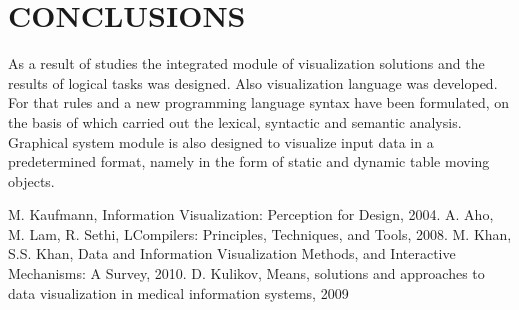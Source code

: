 \documentclass[a4paper, 10pt, conference]{ieeeconf}
\begin{document}
\section{CONCLUSIONS}

As a result of studies the integrated module of visualization solutions and the results of logical tasks was designed. Also visualization language was developed. For that rules and  a new programming language syntax  have been formulated, on the basis of which carried out the lexical, syntactic and semantic analysis. Graphical system module is also designed to visualize input data in a predetermined format, namely in the form of static and dynamic table moving objects.   

\addtolength{\textheight}{-12cm}

\begin{thebibliography}{99}

 M. Kaufmann, Information Visualization: Perception for Design, 2004.
 A. Aho, M. Lam, R. Sethi, LCompilers: Principles, Techniques, and Tools, 2008.
 M. Khan, S.S. Khan, Data and Information Visualization Methods, and
Interactive Mechanisms: A Survey, 2010.
 D. Kulikov, Means, solutions and approaches to data visualization in medical information systems, 2009

\end{thebibliography}
\end{document}
